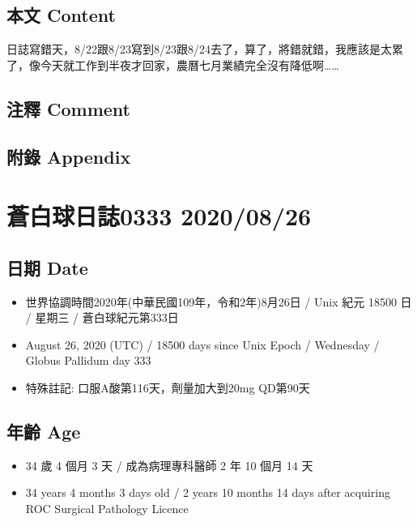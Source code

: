 \documentclass[
]{article}
\providecommand{\tightlist}{%
  \setlength{\itemsep}{0pt}\setlength{\parskip}{0pt}}
\begin{document}
\hypertarget{ux672cux6587-content-24}{%
\subsection{本文 Content}\label{ux672cux6587-content-24}}

日誌寫錯天，8/22跟8/23寫到8/23跟8/24去了，算了，將錯就錯，我應該是太累了，像今天就工作到半夜才回家，農曆七月業績完全沒有降低啊\ldots\ldots{}

\hypertarget{ux6ce8ux91cb-comment-24}{%
\subsection{注釋 Comment}\label{ux6ce8ux91cb-comment-24}}

\hypertarget{ux9644ux9304-appendix-24}{%
\subsection{附錄 Appendix}\label{ux9644ux9304-appendix-24}}

\hypertarget{ux84bcux767dux7403ux65e5ux8a8c0333-20200826}{%
\section{蒼白球日誌0333
2020/08/26}\label{ux84bcux767dux7403ux65e5ux8a8c0333-20200826}}

\hypertarget{ux65e5ux671f-date-25}{%
\subsection{日期 Date}\label{ux65e5ux671f-date-25}}

\begin{itemize}
\tightlist
\item
  世界協調時間2020年(中華民國109年，令和2年)8月26日 / Unix 紀元 18500 日
  / 星期三 / 蒼白球紀元第333日
\item
  August 26, 2020 (UTC) / 18500 days since Unix Epoch / Wednesday /
  Globus Pallidum day 333
\item
  特殊註記: 口服A酸第116天，劑量加大到20mg QD第90天
\end{itemize}

\hypertarget{ux5e74ux9f61-age-25}{%
\subsection{年齡 Age}\label{ux5e74ux9f61-age-25}}

\begin{itemize}
\tightlist
\item
  34 歲 4 個月 3 天 / 成為病理專科醫師 2 年 10 個月 14 天
\item
  34 years 4 months 3 days old / 2 years 10 months 14 days after
  acquiring ROC Surgical Pathology Licence
\end{itemize}
\end{document}
